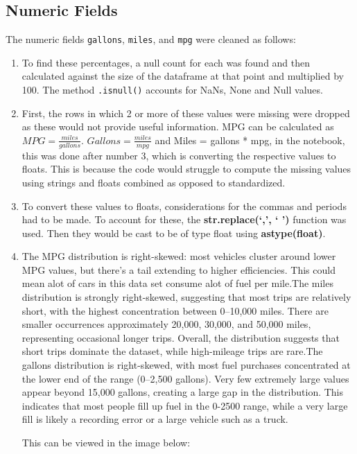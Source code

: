\documentclass{article}
\begin{document}
\subsection{Numeric Fields}
The numeric fields \texttt{gallons}, \texttt{miles}, and \texttt{mpg} were cleaned as follows:
\begin{enumerate}
    \item To find these percentages, a null count for each was found and then calculated against the size of the dataframe at that point and multiplied by 100. The method \texttt{.isnull()} accounts for NaNs, None and Null values.
    \item  First, the rows in which 2 or more of these values were missing were dropped as these would not provide useful information. MPG can be calculated as $MPG = \frac{miles}{gallons}$. $Gallons = \frac{miles}{mpg}$ and Miles = gallons * mpg, in the notebook, this was done after number 3, which is converting the respective values to floats. This is because the code would struggle to compute the missing values using strings and floats combined as opposed to standardized.

    \item  To convert these values to floats, considerations for the commas and periods had to be made. To account for these, the \textbf{str.replace(‘,’, ‘ ’)} function was used. Then they would be cast to be of type float using \textbf{astype(float)}.
    \item The MPG distribution is right-skewed: most vehicles cluster around lower MPG values, but there’s a tail extending to higher efficiencies. This could mean alot of cars in this data set consume alot of fuel per mile.The miles distribution is strongly right-skewed, suggesting that most trips are relatively short, with the highest concentration between 0–10,000 miles. There are smaller occurrences approximately 20,000, 30,000, and 50,000 miles, representing occasional longer trips. Overall, the distribution suggests that short trips dominate the dataset, while high-mileage trips are rare.The gallons distribution is right-skewed, with most fuel purchases concentrated at the lower end of the range (0–2,500 gallons). Very few extremely large values appear beyond 15,000 gallons, creating a large gap in the distribution. This indicates that most people fill up fuel in the 0-2500 range, while a very large fill is likely a recording error or a large vehicle such as a truck.

    This can be viewed in the image below:


\end{enumerate}
\end{document}
